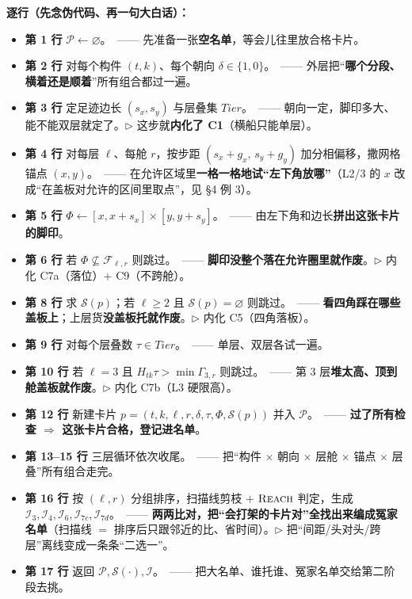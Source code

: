 \documentclass[11pt]{ctexart}
\begin{document}
\textbf{逐行（先念伪代码、再一句大白话）：}
\begin{itemize}[leftmargin=1.8em,itemsep=2pt]
  \item \textbf{第 1 行} $\mathcal{P}\gets\varnothing$。\ —— 先准备一张\textbf{空名单}，等会儿往里放合格卡片。
  \item \textbf{第 2 行} 对每个构件 $(t,k)$、每个朝向 $\delta\in\{1,0\}$。\ —— 外层把“\textbf{哪个分段、横着还是顺着}”所有组合都过一遍。
  \item \textbf{第 3 行} 定足迹边长 $(s_x,s_y)$ 与层叠集 $\textit{Tier}$。\ —— 朝向一定，脚印多大、能不能双层就定了。$\triangleright$ 这步就\textbf{内化了 C1}（横船只能单层）。
  \item \textbf{第 4 行} 对每层 $\ell$、每舱 $r$，按步距 $(s_x{+}g_x,\,s_y{+}g_y)$ 加分相偏移，撒网格锚点 $(x,y)$。\ —— 在允许区域里\textbf{一格一格地试“左下角放哪”}（L2/3 的 $x$ 改成“在盖板对允许的区间里取点”，见 \S4 例 3）。
  \item \textbf{第 5 行} $\Phi\gets[x,x{+}s_x]\times[y,y{+}s_y]$。\ —— 由左下角和边长\textbf{拼出这张卡片的脚印}。
  \item \textbf{第 6 行} 若 $\Phi\not\subseteq\mathcal{F}_{\ell,r}$ 则跳过。\ —— \textbf{脚印没整个落在允许圈里就作废}。$\triangleright$ 内化 C7a（落位）$+$ C9（不跨舱）。
  \item \textbf{第 8 行} 求 $\mathcal{S}(p)$；若 $\ell\ge2$ 且 $\mathcal{S}(p)=\varnothing$ 则跳过。\ —— \textbf{看四角踩在哪些盖板上}；上层货\textbf{没盖板托就作废}。$\triangleright$ 内化 C5（四角落板）。
  \item \textbf{第 9 行} 对每个层叠数 $\tau\in\textit{Tier}$。\ —— 单层、双层各试一遍。
  \item \textbf{第 10 行} 若 $\ell=3$ 且 $H_{tk}\tau>\min\Gamma_{3,r}$ 则跳过。\ —— 第 3 层\textbf{堆太高、顶到舱盖板就作废}。$\triangleright$ 内化 C7b（L3 硬限高）。
  \item \textbf{第 12 行} 新建卡片 $p=(t,k,\ell,r,\delta,\tau,\Phi,\mathcal{S}(p))$ 并入 $\mathcal{P}$。\ —— \textbf{过了所有检查 $\Rightarrow$ 这张卡片合格，登记进名单}。
  \item \textbf{第 13--15 行} 三层循环依次收尾。\ —— 把“构件 $\times$ 朝向 $\times$ 层舱 $\times$ 锚点 $\times$ 层叠”所有组合走完。
  \item \textbf{第 16 行} 按 $(\ell,r)$ 分组排序，扫描线剪枝 $+$ $\textsc{Reach}$ 判定，生成 $\mathcal{I}_3,\mathcal{I}_4,\mathcal{I}_6,\mathcal{I}_{7c},\mathcal{I}_{7d}$。\ —— \textbf{两两比对，把“会打架的卡片对”全找出来编成冤家名单}（扫描线 $=$ 排序后只跟邻近的比、省时间）。$\triangleright$ 把“间距/头对头/跨层”离线变成一条条“二选一”。
  \item \textbf{第 17 行} 返回 $\mathcal{P},\mathcal{S}(\cdot),\mathcal{I}$。\ —— 把大名单、谁托谁、冤家名单交给第二阶段去挑。
\end{itemize}
\end{document}
